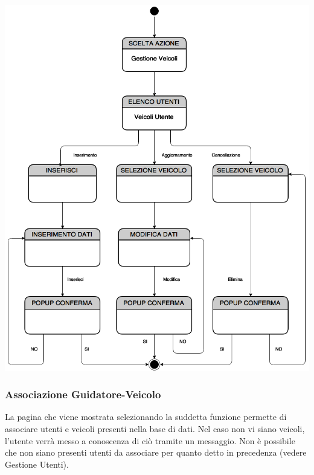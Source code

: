 \documentclass[a4paper,12pt]{beamer}
\begin{document}
\begin{frame}

\begin{center}
\includegraphics[scale=0.2]{../UseCase/Veicoli.png}
\end{center}
\end{frame}

\begin{frame}
\frametitle{Associazione Guidatore-Veicolo}
La pagina che viene mostrata selezionando la suddetta funzione permette di associare utenti e veicoli presenti nella base di dati. Nel caso non vi siano veicoli, l'utente verrà messo a conoscenza di ciò tramite un messaggio. Non è possibile che non siano presenti utenti da associare per quanto detto in precedenza (vedere Gestione Utenti).
\end{frame}
\end{document}
